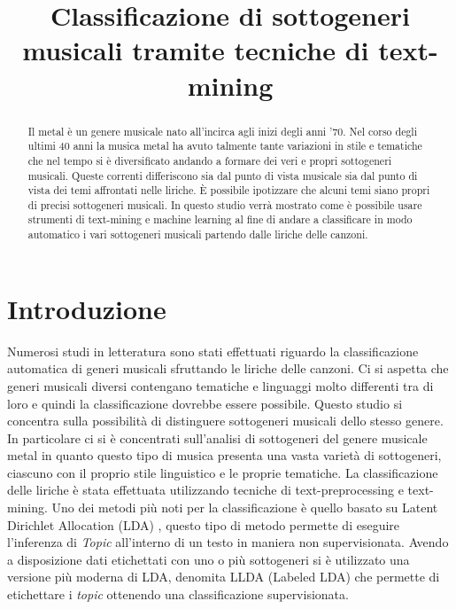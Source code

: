 \documentclass[technote]{IEEEtran}
\begin{document}
\title{Classificazione di sottogeneri musicali tramite tecniche di text-mining}

\author{
\and
{}
\and
{}
}
\maketitle

\begin{abstract}
Il metal \`e un genere musicale nato all’incirca
agli inizi degli anni ’70. Nel corso degli ultimi 40 anni la musica
metal ha avuto talmente tante variazioni in stile e tematiche
che nel tempo si \`e diversificato andando a formare dei veri e
propri sottogeneri musicali. Queste correnti differiscono sia dal
punto di vista musicale sia dal punto di vista dei temi affrontati
nelle liriche. \`E possibile ipotizzare che alcuni temi siano propri di
precisi sottogeneri musicali. In questo studio verr\`a mostrato come
\`e possibile usare strumenti di text-mining e machine learning al
fine di andare a classificare in modo automatico i vari sottogeneri
musicali partendo dalle liriche delle canzoni.
\end{abstract}

\tableofcontents

\section{Introduzione}
Numerosi studi in letteratura sono stati effettuati riguardo la classificazione
automatica di generi musicali sfruttando le liriche delle canzoni. Ci si aspetta
che generi musicali diversi contengano tematiche e linguaggi molto differenti
tra di loro e quindi la classificazione dovrebbe essere possibile.
Questo studio si concentra sulla possibilità di distinguere sottogeneri musicali
dello stesso genere.
In particolare ci si è concentrati sull'analisi di sottogeneri del genere musicale
metal in quanto questo tipo di musica presenta una vasta varietà di sottogeneri, ciascuno con il proprio stile linguistico e le proprie tematiche.
La classificazione delle liriche è stata effettuata utilizzando tecniche di
text-preprocessing e text-mining.
Uno dei metodi più noti per la classificazione è quello basato su
Latent Dirichlet Allocation (LDA) \cite{LDA}, questo tipo di metodo permette di eseguire l'inferenza di \textit{Topic} all'interno di un testo in maniera non supervisionata.
Avendo a disposizione dati etichettati con uno o più sottogeneri si è utilizzato una versione più moderna di LDA, denomita LLDA (Labeled LDA) \cite{ramage-etal-2009-labeled} che permette di etichettare i \textit{topic} ottenendo una classificazione supervisionata.  
\end{document}
